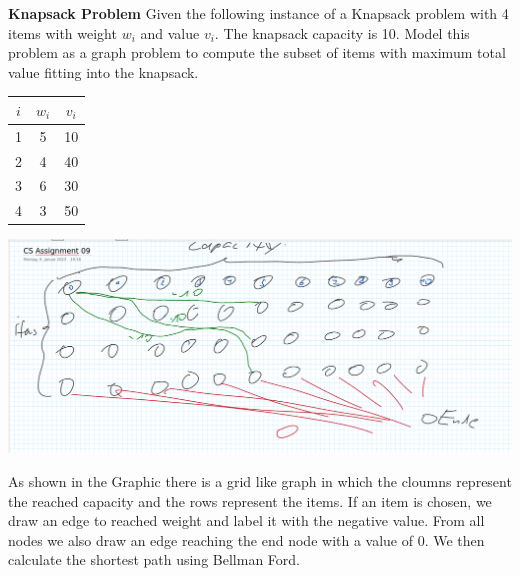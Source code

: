 \question \textbf{Knapsack Problem}
Given the following instance of a Knapsack problem with 4 items with weight $w_i$ and value $v_i$. The knapsack capacity is 10. Model this problem as a graph problem to compute the subset of items with maximum total value fitting into the knapsack.

\begin{tabular}{c | c | c}
    $i$ & $w_i$ & $v_i$ \\
    \hline
    1 & 5 & 10 \\
    2 & 4 & 40 \\
    3 & 6 & 30 \\
    4 & 3 & 50
    \end{tabular}

\begin{solution}


\includegraphics[width=0.8\linewidth]{task_5/Task_5.png}

As shown in the Graphic there is a grid like graph in which the cloumns represent the reached capacity and the rows represent the items.
If an item is chosen, we draw an edge to reached weight and label it with the negative value. From all nodes we also draw an edge reaching the end node with a value of 0.
We then calculate the shortest path using Bellman Ford. 


\end{solution}